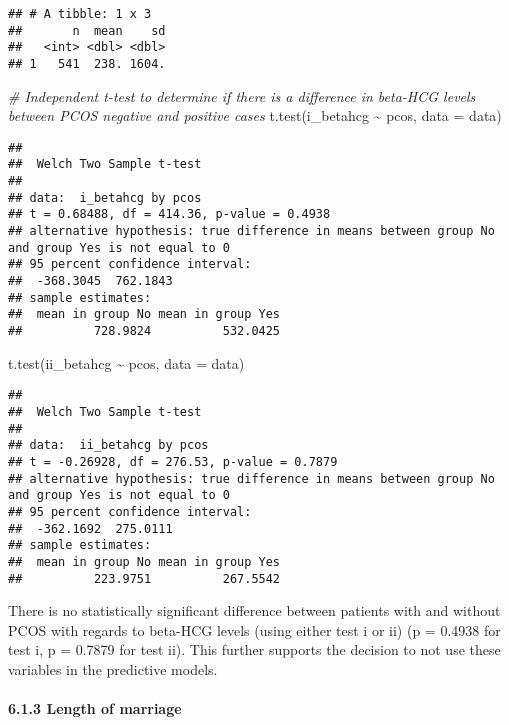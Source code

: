 \documentclass[
]{article}
\newenvironment{Shaded}{\begin{snugshade}}{\end{snugshade}}
\newcommand{\AttributeTok}[1]{\textcolor[rgb]{0.77,0.63,0.00}{#1}}
\newcommand{\CommentTok}[1]{\textcolor[rgb]{0.56,0.35,0.01}{\textit{#1}}}
\newcommand{\FunctionTok}[1]{\textcolor[rgb]{0.00,0.00,0.00}{#1}}
\newcommand{\NormalTok}[1]{#1}
\newcommand{\SpecialCharTok}[1]{\textcolor[rgb]{0.00,0.00,0.00}{#1}}
\begin{document}
\begin{verbatim}
## # A tibble: 1 x 3
##       n  mean    sd
##   <int> <dbl> <dbl>
## 1   541  238. 1604.
\end{verbatim}

\begin{Shaded}
\begin{Highlighting}[]
\CommentTok{\# Independent t{-}test to determine if there is a difference in beta{-}HCG levels between PCOS negative and positive cases}
\FunctionTok{t.test}\NormalTok{(i\_betahcg }\SpecialCharTok{\textasciitilde{}}\NormalTok{ pcos, }\AttributeTok{data =}\NormalTok{ data)}
\end{Highlighting}
\end{Shaded}

\begin{verbatim}
## 
##  Welch Two Sample t-test
## 
## data:  i_betahcg by pcos
## t = 0.68488, df = 414.36, p-value = 0.4938
## alternative hypothesis: true difference in means between group No and group Yes is not equal to 0
## 95 percent confidence interval:
##  -368.3045  762.1843
## sample estimates:
##  mean in group No mean in group Yes 
##          728.9824          532.0425
\end{verbatim}

\begin{Shaded}
\begin{Highlighting}[]
\FunctionTok{t.test}\NormalTok{(ii\_betahcg }\SpecialCharTok{\textasciitilde{}}\NormalTok{ pcos, }\AttributeTok{data =}\NormalTok{ data)}
\end{Highlighting}
\end{Shaded}

\begin{verbatim}
## 
##  Welch Two Sample t-test
## 
## data:  ii_betahcg by pcos
## t = -0.26928, df = 276.53, p-value = 0.7879
## alternative hypothesis: true difference in means between group No and group Yes is not equal to 0
## 95 percent confidence interval:
##  -362.1692  275.0111
## sample estimates:
##  mean in group No mean in group Yes 
##          223.9751          267.5542
\end{verbatim}

There is no statistically significant difference between patients with
and without PCOS with regards to beta-HCG levels (using either test i or
ii) (p = 0.4938 for test i, p = 0.7879 for test ii). This further
supports the decision to not use these variables in the predictive
models.

\hypertarget{length-of-marriage}{%
\paragraph{6.1.3 Length of marriage}\label{length-of-marriage}}
\end{document}
